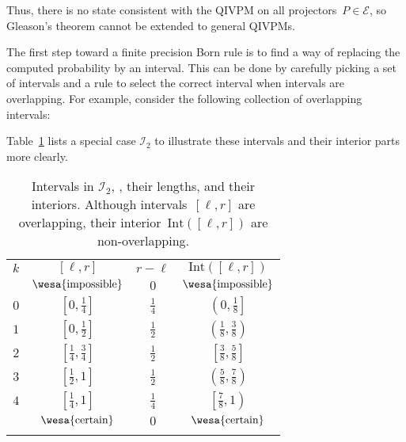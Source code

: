 \documentclass[english,reprint, aps, prl,superscriptaddress, showpacs,
showkeys, longbibliography, amsmath, amssymb, floatfix]{revtex4-1}
\theoremstyle{plain}
\theoremstyle{definition}
\newcommand{\events}{\ensuremath{\mathcal{E}}}
\newcommand{\imposs}{{\text{\wesa{impossible}}}}
\newcommand{\necess}{{\text{\wesa{certain}}}}
\begin{document}
\noindent Thus, there is no state consistent with the QIVPM on all
projectors~$P\in\events$, so Gleason's theorem cannot be extended
to general QIVPMs.

The first step toward a finite precision Born rule is to find a way
of replacing the computed probability by an interval. This can be
done by carefully picking a set of intervals and a rule to select
the correct interval when intervals are overlapping. For example,
consider the following collection of overlapping intervals:

Table~\ref{tab:I_2} lists a special case $\mathscr{I}_{2}$ to illustrate
these intervals and their interior parts more clearly.
\begin{table}
\caption{\label{tab:I_2}Intervals in $\mathscr{I}_{2}$, , their lengths,
and their interiors. Although intervals~$[\ell,r]$ are overlapping,
their interior~$\textrm{Int}\left([\ell,r]\right)$ are non-overlapping.}

\begin{tabular}{cccc}
\toprule 
\addlinespace
$k$ & $[\ell,r]$ & $r-\ell$ & $\textrm{Int}\left([\ell,r]\right)$\tabularnewline\addlinespace
\midrule
\midrule 
\addlinespace
 & $\imposs$ & $0$ & $\imposs$\tabularnewline\addlinespace
\midrule 
\addlinespace
$0$ & $\left[0,\tfrac{1}{4}\right]$ & $\tfrac{1}{4}$ & $\left(0,\tfrac{1}{8}\right]$\tabularnewline\addlinespace
\midrule 
\addlinespace
$1$ & $\left[0,{\textstyle \tfrac{1}{2}}\right]$ & $\tfrac{1}{2}$ & $\left(\tfrac{1}{8},\tfrac{3}{8}\right)$\tabularnewline\addlinespace
\midrule 
\addlinespace
$2$ & $\left[\tfrac{1}{4},\tfrac{3}{4}\right]$ & $\tfrac{1}{2}$ & $\left[\tfrac{3}{8},\tfrac{5}{8}\right]$\tabularnewline\addlinespace
\midrule 
\addlinespace
$3$ & $\left[\tfrac{1}{2},1\right]$ & $\tfrac{1}{2}$ & $\left(\tfrac{5}{8},\tfrac{7}{8}\right)$\tabularnewline\addlinespace
\midrule 
\addlinespace
$4$ & $\left[\tfrac{1}{4},1\right]$ & $\tfrac{1}{4}$ & $\left[\tfrac{7}{8},1\right)$\tabularnewline\addlinespace
\midrule 
\addlinespace
 & $\necess$ & $0$ & $\necess$\tabularnewline\addlinespace
\bottomrule
\end{tabular}
\end{table}
 
\end{document}
